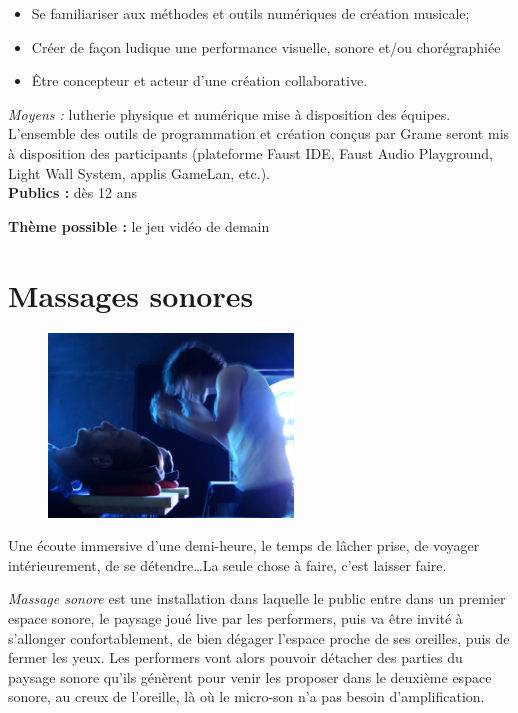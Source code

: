 \documentclass[fontsize=12pt]{scrartcl} %
\numberwithin{equation}{section} %
\numberwithin{table}{section} %
\begin{document}
\begin{itemize} 
\item Se familiariser aux méthodes et outils numériques de création musicale; 
\item Créer de façon ludique une performance  visuelle, sonore et/ou  chorégraphiée
\item Être concepteur et acteur d'une création collaborative.
\end{itemize}
     	 
\textit{Moyens :} lutherie physique et numérique mise à disposition des équipes. 
L'ensemble des outils de programmation et création conçus par Grame seront mis à disposition des participants (plateforme Faust IDE, Faust Audio Playground, Light Wall System, applis GameLan, etc.).\\

\noindent
\textbf{Publics :} dès 12 ans

\noindent
\textbf{Thème possible :} le jeu vidéo de demain 

\pagebreak

\section{Massages sonores}
\label{app:massage}

\begin{figure}
\centering
\includegraphics[width=6.5cm]{img/massage}
\label{fig:massage}
\end{figure}

Une écoute immersive d'une demi-heure, le temps de lâcher prise, de voyager intérieurement, de se détendre\dots La seule chose à faire, c'est laisser faire.

\textit{Massage sonore} est une installation dans laquelle le public entre dans un premier espace sonore, le paysage joué live par les performers, puis va être invité à s'allonger confortablement, de bien dégager l'espace proche de ses oreilles, puis de fermer les yeux. Les performers vont alors pouvoir détacher des parties du paysage sonore qu'ils génèrent pour venir les proposer dans le deuxième espace sonore, au creux de l'oreille, là où le micro-son n'a pas besoin d'amplification.
\end{document}
